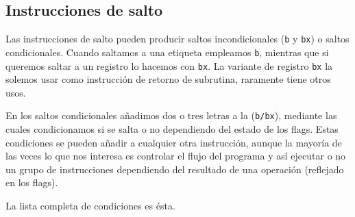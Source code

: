 \subsection{Instrucciones de salto}

Las instrucciones de salto pueden producir saltos incondicionales ({\tt b} y {\tt bx})
o saltos condicionales. Cuando saltamos a una etiqueta empleamos {\tt b}, mientras que
si queremos saltar a un registro lo hacemos con {\tt bx}. La variante de registro {\tt bx}
la solemos usar como instrucción de retorno de subrutina, raramente tiene otros usos.

En los saltos condicionales añadimos dos o tres letras
a la ({\tt b/bx}), mediante las cuales condicionamos si se salta o no dependiendo
del estado de los flags. Estas condiciones se pueden añadir a cualquier
otra instrucción, aunque la mayoría de las veces lo que nos interesa es controlar
el flujo del programa y así ejecutar o no un grupo de instrucciones dependiendo
del resultado de una operación (reflejado en los flags).

La lista completa de condiciones es ésta.

